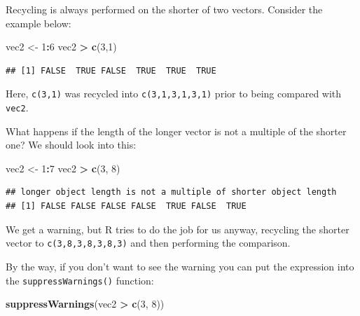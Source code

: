 \documentclass[]{book}
\makeatletter
\newenvironment{Shaded}{\begin{snugshade}}{\end{snugshade}}
\newcommand{\KeywordTok}[1]{\textcolor[rgb]{0.13,0.29,0.53}{\textbf{#1}}}
\newcommand{\DecValTok}[1]{\textcolor[rgb]{0.00,0.00,0.81}{#1}}
\newcommand{\StringTok}[1]{\textcolor[rgb]{0.31,0.60,0.02}{#1}}
\newcommand{\OperatorTok}[1]{\textcolor[rgb]{0.81,0.36,0.00}{\textbf{#1}}}
\newcommand{\NormalTok}[1]{#1}
\newenvironment{kframe}{%
\medskip{}
\setlength{\fboxsep}{.8em}
 \def\at@end@of@kframe{}%
 \ifinner\ifhmode%
  \def\at@end@of@kframe{\end{minipage}}%
  \begin{minipage}{\columnwidth}%
 \fi\fi%
 \def\FrameCommand##1{\hskip\@totalleftmargin \hskip-\fboxsep
 \colorbox{shadecolor}{##1}\hskip-\fboxsep
     \hskip-\linewidth \hskip-\@totalleftmargin \hskip\columnwidth}%
 \MakeFramed {\advance\hsize-\width
   \@totalleftmargin\z@ \linewidth\hsize
   \@setminipage}}%
 {\par\unskip\endMakeFramed%
 \at@end@of@kframe}
\renewenvironment{Shaded}{\begin{kframe}}{\end{kframe}}
\theoremstyle{definition}
\theoremstyle{definition}
\theoremstyle{definition}
\theoremstyle{remark}
\makeatother
\begin{document}
Recycling is always performed on the shorter of two vectors. Consider
the example below:

\begin{Shaded}
\begin{Highlighting}[]
\NormalTok{vec2 <-}\StringTok{ }\DecValTok{1}\OperatorTok{:}\DecValTok{6}
\NormalTok{vec2 }\OperatorTok{>}\StringTok{ }\KeywordTok{c}\NormalTok{(}\DecValTok{3}\NormalTok{,}\DecValTok{1}\NormalTok{)}
\end{Highlighting}
\end{Shaded}

\begin{verbatim}
## [1] FALSE  TRUE FALSE  TRUE  TRUE  TRUE
\end{verbatim}

Here, \texttt{c(3,1)} was recycled into \texttt{c(3,1,3,1,3,1)} prior to
being compared with \texttt{vec2}.

What happens if the length of the longer vector is not a multiple of the
shorter one? We should look into this:

\begin{Shaded}
\begin{Highlighting}[]
\NormalTok{vec2 <-}\StringTok{ }\DecValTok{1}\OperatorTok{:}\DecValTok{7}
\NormalTok{vec2 }\OperatorTok{>}\StringTok{ }\KeywordTok{c}\NormalTok{(}\DecValTok{3}\NormalTok{, }\DecValTok{8}\NormalTok{)}
\end{Highlighting}
\end{Shaded}

\begin{verbatim}
## longer object length is not a multiple of shorter object length
## [1] FALSE FALSE FALSE FALSE  TRUE FALSE  TRUE
\end{verbatim}

We get a warning, but R tries to do the job for us anyway, recycling the
shorter vector to \texttt{c(3,8,3,8,3,8,3)} and then performing the
comparison.

By the way, if you don't want to see the warning you can put the
expression into the
\texttt{suppressWarnings()}
function:

\begin{Shaded}
\begin{Highlighting}[]
\KeywordTok{suppressWarnings}\NormalTok{(vec2 }\OperatorTok{>}\StringTok{ }\KeywordTok{c}\NormalTok{(}\DecValTok{3}\NormalTok{, }\DecValTok{8}\NormalTok{))}
\end{Highlighting}
\end{Shaded}
\end{document}
